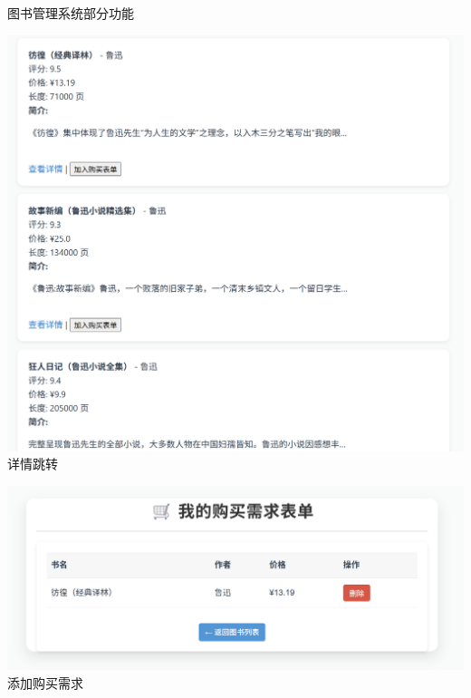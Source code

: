 \documentclass{ctexbeamer}
\begin{document}
\begin{frame}{图书管理系统部分功能}
  \begin{minipage}{0.45\textwidth}
    \includegraphics[width=\textwidth]{fig/book3.png}\\ 详情跳转
  \end{minipage}
  \begin{minipage}{0.45\textwidth}
    \includegraphics[width=\textwidth]{fig/book4.png}\\ 添加购买需求
  \end{minipage}
\end{frame}
\end{document}
